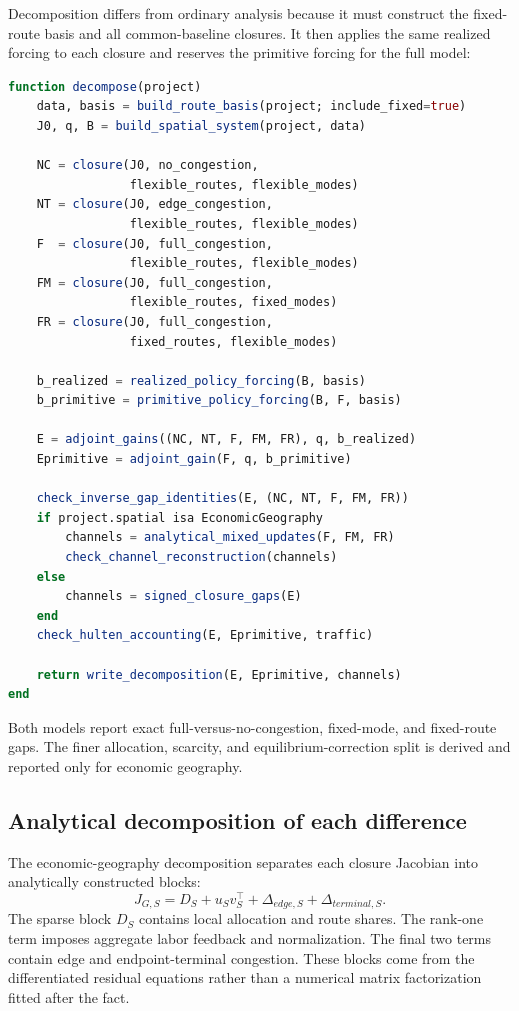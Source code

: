 Decomposition differs from ordinary analysis because it must construct the
fixed-route basis and all common-baseline closures. It then applies the same
realized forcing to each closure and reserves the primitive forcing for the
full model:
\begin{lstlisting}[language=Julia]
function decompose(project)
    data, basis = build_route_basis(project; include_fixed=true)
    J0, q, B = build_spatial_system(project, data)

    NC = closure(J0, no_congestion,
                 flexible_routes, flexible_modes)
    NT = closure(J0, edge_congestion,
                 flexible_routes, flexible_modes)
    F  = closure(J0, full_congestion,
                 flexible_routes, flexible_modes)
    FM = closure(J0, full_congestion,
                 flexible_routes, fixed_modes)
    FR = closure(J0, full_congestion,
                 fixed_routes, flexible_modes)

    b_realized = realized_policy_forcing(B, basis)
    b_primitive = primitive_policy_forcing(B, F, basis)

    E = adjoint_gains((NC, NT, F, FM, FR), q, b_realized)
    Eprimitive = adjoint_gain(F, q, b_primitive)

    check_inverse_gap_identities(E, (NC, NT, F, FM, FR))
    if project.spatial isa EconomicGeography
        channels = analytical_mixed_updates(F, FM, FR)
        check_channel_reconstruction(channels)
    else
        channels = signed_closure_gaps(E)
    end
    check_hulten_accounting(E, Eprimitive, traffic)

    return write_decomposition(E, Eprimitive, channels)
end
\end{lstlisting}

Both models report exact full-versus-no-congestion, fixed-mode, and
fixed-route gaps. The finer allocation, scarcity, and equilibrium-correction
split is derived and reported only for economic geography.

\subsection{Analytical decomposition of each difference}

The economic-geography decomposition separates each closure Jacobian into
analytically constructed blocks:
\[
 J_{G,S}=D_S+u_Sv_S^\top
     +\Delta_{edge,S}
     +\Delta_{terminal,S}.
\]
The sparse block \(D_S\) contains local allocation and route shares. The
rank-one term imposes aggregate labor feedback and normalization. The final
two terms contain edge and endpoint-terminal congestion. These blocks come
from the differentiated residual equations rather than a numerical matrix
factorization fitted after the fact.


